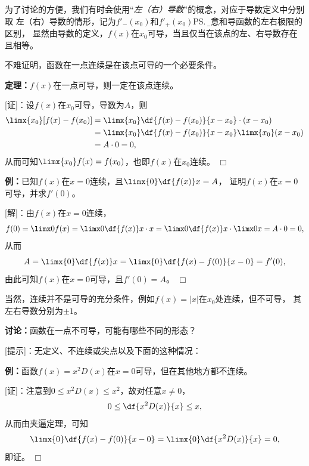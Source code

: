 为了讨论的方便，我们有时会使用“{\it 左（右）导数}”的概念，对应于导数定义中分别取
左（右）导数的情形，记为$f'_-(x_0)$和$f'_+(x_0)$\ps{\b 注意和导函数的左右极限的区别}，
显然由导数的定义，$f(x)$在$x_0$可导，当且仅当在该点的左、右导数存在且相等。


% 

不难证明，函数在一点连续是在该点可导的一个必要条件。

{\bf 定理：}$f(x)$在一点可导，则一定在该点连续。

[证]：设$f(x)$在$x_0$可导，导数为$A$，则
\begin{align*}
	\limx{x_0}[f(x)-f(x_0)]
	&=\limx{x_0}\df{f(x)-f(x_0)}{x-x_0}\cdot(x-x_0)\\
	&=\limx{x_0}\df{f(x)-f(x_0)}{x-x_0}\limx{x_0}(x-x_0)\\
	&=A\cdot 0=0,
\end{align*}
从而可知$\limx{x_0}f(x)=f(x_0)$，也即$f(x)$在$x_0$连续。
\hfill$\Box$

{\bf 例：}已知$f(x)$在$x=0$连续，且$\limx{0}\df{f(x)}x=A$，
证明$f(x)$在$x=0$可导，并求$f'(0)$。

[解]：由$f(x)$在$x=0$连续，
$$f(0)=\limx0f(x)=\limx0\df{f(x)}x\cdot x
=\limx0\df{f(x)}x\cdot\limx0x=A\cdot 0=0,$$
从而
$$A=\limx{0}\df{f(x)}x=\limx{0}\df{f(x)-f(0)}{x-0}=f'(0),$$
由此可知$f(x)$在$x=0$可导，且$f'(0)=A$。
\hfill$\Box$

当然，连续并不是可导的充分条件，例如$f(x)=|x|$在$x_0$处连续，但不可导，
其左右导数分别为$\pm 1$。

{\bf 讨论：}函数在一点不可导，可能有哪些不同的形态？

[提示]：无定义、不连续或尖点以及下面的这种情况：

{\bf 例：}函数$f(x)=x^2D(x)$在$x=0$可导，但在其他地方都不连续。

[证]：注意到$0\leq x^2D(x)\leq x^2$，故对任意$x\ne 0$，
$$0\leq \df{x^2D(x)}{x}\leq x,$$
从而由夹逼定理，可知
$$\limx{0}\df{f(x)-f(0)}{x-0}=\limx{0}\df{x^2D(x)}{x}=0,$$
即证。
\hfill$\Box$

